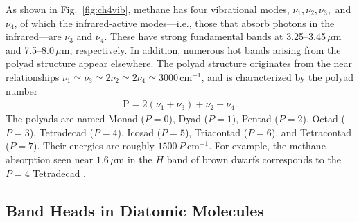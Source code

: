 As shown in Fig.~\ref{fig:ch4vib}, methane has four vibrational modes, $\nu_1, \nu_2, \nu_3,$ and $\nu_4$, of which the infrared-active modes—i.e., those that absorb photons in the infrared—are $\nu_3$ and $\nu_4$. These have strong fundamental bands at 3.25–3.45\,$\mu$m and 7.5–8.0\,$\mu$m, respectively. In addition, numerous hot bands arising from the polyad structure appear elsewhere. The polyad structure originates from the near relationships
$\nu_1 \simeq \nu_3 \simeq 2 \nu_2 \simeq 2 \nu_4 \simeq 3000\,\mathrm{cm}^{-1}$,
and is characterized by the polyad number
\begin{align}
\mathrm{P} =  2 (\nu_1 + \nu_3) + \nu_2 + \nu_4.
\end{align}
The polyads are named Monad ($P=0$), Dyad ($P=1$), Pentad ($P=2$), Octad ($P=3$), Tetradecad ($P=4$), Icosad ($P=5$), Triacontad ($P=6$), and Tetracontad ($P=7$). Their energies are roughly $1500\,P\ \mathrm{cm}^{-1}$. For example, the methane absorption seen near $1.6\,\mu$m in the $H$ band of brown dwarfs corresponds to the $P=4$ Tetradecad \cite{2024JQSRT.31608897K}.\\

\subsection*{Band Heads in Diatomic Molecules}

